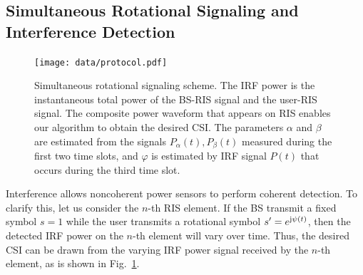 \documentclass[conference,10pt,twocolumn]{IEEEtran}
\theoremstyle{nonumberplain}
\begin{document}
\subsection{Simultaneous Rotational Signaling and Interference Detection} \label{Simultaneous Rotational Signaling and Interference Detection}
    \begin{figure}[!t]
        \centering
        \texttt{[image: data/protocol.pdf]}
        \caption{Simultaneous rotational signaling scheme. The IRF power is the instantaneous total power of the BS-RIS signal and the user-RIS signal. The composite power waveform that appears on RIS enables our algorithm to obtain the desired CSI. The parameters $\alpha$ and $\beta$ are estimated from the signals $P_{\alpha}(t), P_{\beta}(t)$ measured during the first two time slots, and $\varphi$ is estimated by IRF signal $P(t)$ that occurs during the third time slot.}
        \label{fig:protocol}
    \end{figure}

    Interference allows noncoherent power sensors to perform coherent detection. 
    To clarify this, let us consider the $n$-th RIS element. If the BS transmit a fixed symbol $s=1$ while the user transmits a rotational symbol $s'=e^{{\rm j}\psi(t)}$, then the detected IRF power on the $n$-th element will vary over time. 
    Thus, the desired CSI can be drawn from the varying IRF power signal received by the $n$-th element, as is shown in Fig.~\ref{fig:protocol}. 
\end{document}
